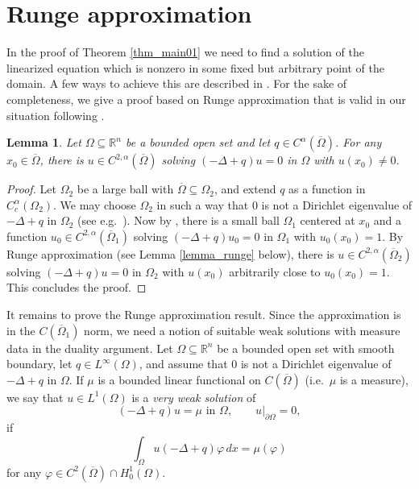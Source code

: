 \documentclass[11pt,a4paper]{amsart}
\newtheorem{Lemma}[Theorem]{Lemma}
\theoremstyle{definition}
\numberwithin{equation}{section}
\newcommand{\mR}{\mathbb{R}}                    %
\newcommand{\ol}[1]{\overline{#1}}
\newcommand{\p}{\partial}
\newcommand{\Om}{\Omega}
\begin{document}
\appendix

\section{Runge approximation}\label{sec_runge}

In the proof of Theorem \ref{thm_main01} we need to find a solution of the linearized equation which is nonzero in some fixed but arbitrary point of the domain. A few ways to achieve this are described in \cite[Remark 2.2]{LLLS2}. For the sake of completeness, we give a proof based on Runge approximation that is valid in our situation following \cite{LassasLiimatainenSalo_poissonembedding}.

\begin{Lemma}\label{lemma:nonzero_solution}
Let $\Omega \subseteq \mR^n$ be a bounded open set and let $q \in C^{\alpha}(\ol{\Om})$. For any $x_0 \in \ol{\Om}$, there is $u \in C^{2,\alpha}(\ol{\Om})$ solving $(-\Delta+q)u=0$ in $\Om$ with $u(x_0) \neq 0$.
\end{Lemma}
\begin{proof}
Let $\Omega_2$ be a large ball with $\ol{\Omega} \subseteq \Omega_2$, and extend $q$ as a function in $C^{\alpha}_c(\Omega_2)$. We may choose $\Omega_2$ in such a way that $0$ is not a Dirichlet eigenvalue of $-\Delta+q$ in $\Omega_2$ (see e.g.\ \cite[Lemma 3.2]{Stefanov1990}). Now by \cite[Theorem 1 in Section 5.4]{bjs}, there is a small ball $\Omega_1$ centered at $x_0$ and a function $u_0 \in C^{2,\alpha}(\ol{\Om}_1)$ solving $(-\Delta+q)u_0 = 0$ in $\Omega_1$ with $u_0(x_0) = 1$. By Runge approximation (see Lemma \ref{lemma_runge} below), there is $u \in C^{2,\alpha}(\ol{\Om}_2)$ solving $(-\Delta+q)u=0$ in $\Om_2$ with $u(x_0)$ arbitrarily close to $u_0(x_0) = 1$. This concludes the proof.
\end{proof}

It remains to prove the Runge approximation result. Since the approximation is in the $C(\ol{\Om}_1)$ norm, we need a notion of suitable weak solutions with measure data in the duality argument. Let $\Omega \subseteq \mR^n$ be a bounded open set with smooth boundary, let $q \in L^{\infty}(\Omega)$, and assume that $0$ is not a Dirichlet eigenvalue of $-\Delta+q$ in $\Omega$. If $\mu$ is a bounded linear functional on $C(\ol{\Om})$ (i.e.\ $\mu$ is a measure), we say that $u \in L^1(\Omega)$ is a \emph{very weak solution} of
\begin{equation} \label{veryweak_def}
(-\Delta+q)u = \mu \text{ in $\Omega$}, \qquad u|_{\p \Omega} = 0,
\end{equation}
if 
\[
\int_{\Om} u(-\Delta+q)\varphi \,dx = \mu(\varphi)
\]
for any $\varphi \in C^2(\ol{\Om}) \cap H^1_0(\Om)$.
\end{document}
